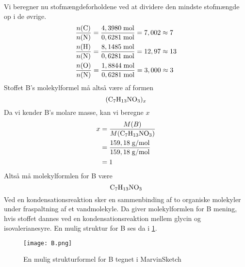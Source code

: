 \documentclass{report}
\begin{document}
Vi beregner nu stofmængdeforholdene ved at dividere den mindste stofmængde op i de øvrige.
\begin{equation*}
\begin{split}
  &\frac{n(\ce{C} )}{n(\ce{N} )}=\frac{4,3980 \;\unit{mol} }{0,6281 \;\unit{mol} }=7,002 \approx 7\\
  &\frac{n(\ce{H} )}{n(\ce{N} )}=\frac{8,1485 \;\unit{mol} }{0,6281 \;\unit{mol} }=12,97 \approx 13\\
  &\frac{n(\ce{O} )}{n(\ce{N} )}=\frac{1,8844 \;\unit{mol} }{0,6281 \;\unit{mol} }=3,000 \approx 3
\end{split}
\end{equation*}
Stoffet B's molekylformel må altså være af formen
\[
\ce{(C7H13NO3)_x} 
\] 
Da vi kender B's molare masse, kan vi beregne $x$
\begin{equation*}
\begin{split}
  x&=\frac{M(B)}{M(\ce{C7H13NO3})}\\
  &=\frac{159,18 \;\unit{g/mol} }{159,18 \;\unit{g/mol} }\\
  &=1
\end{split}
\end{equation*}
Altså må molekylformlen for B være
\[
\ce{C7H13NO3} 
\] 
Ved en kondensationsreaktion sker en sammenbinding af to organiske molekyler under fraspaltning af et vandmolekyle.
Da giver molekylformlen for B mening, hvis stoffet dannes ved en kondensationsreaktion mellem glycin og isovalerianesyre. 
En mulig struktur for B ses da i \cref{fig:B}.
\begin{figure}[H]
\begin{center}
  \texttt{[image: B.png]}
\end{center}
\caption{En mulig strukturformel for B tegnet i MarvinSketch}
\label{fig:B}
\end{figure}
\end{document}

